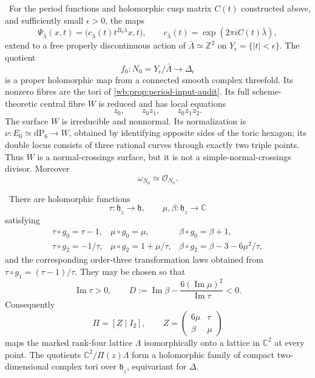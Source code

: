 \begin{theorem}
\label{wb:thm:candidate-cusp-geometry}
\ For the period functions and holomorphic cusp matrix \(C(t)\)
constructed above, and sufficiently small \(\epsilon>0\), the maps
\[
 \Psi_{\bar\lambda}(x,t)=
 \bigl(c_{\bar\lambda}(t)t^{B_0\bar\lambda}x,t\bigr),
 \qquad
 c_{\bar\lambda}(t)=\exp(2\pi iC(t)\bar\lambda),
\tag{2.5}
\]
extend to a free properly discontinuous action of
\(\bar\Lambda\simeq\mathbb Z^2\) on
\(Y_\epsilon=\{|t|<\epsilon\}\).  The quotient
\[
 f_0:N_0=Y_\epsilon/\bar\Lambda\longrightarrow\Delta_\epsilon
\]
is a proper holomorphic map from a connected smooth complex threefold.
Its nonzero fibres are the tori of \cref{wb:prop:period-input-audit}.  Its full
scheme-theoretic central fibre \(W\) is reduced and has local equations
\[
 z_0,\qquad z_0z_1,\qquad z_0z_1z_2.
\tag{2.6}
\]
The surface \(W\) is irreducible and nonnormal.  Its normalization is
\(\nu:E_0\simeq\mathrm{dP}_6\to W\), obtained by identifying opposite sides
of the toric hexagon; its double locus consists of three rational curves
through exactly two triple points.  Thus \(W\) is a normal-crossings surface,
but it is not a simple-normal-crossings divisor.  Moreover
\[
 \omega_{N_0}\simeq\mathcal O_{N_0}.
\tag{2.6a}
\]
\end{theorem}

\begin{proposition}
\label{wb:prop:period-input-audit}
\ There are holomorphic functions
\[
 \tau:\mathfrak h_z\to\mathfrak h,
 \qquad \mu,\beta:\mathfrak h_z\to\mathbb C
\]
satisfying
\[
\begin{array}{lll}
\tau\circ g_0=\tau-1,&\mu\circ g_0=\mu,&\beta\circ g_0=\beta+1,\\
\tau\circ g_2=-1/\tau,&\mu\circ g_2=1+\mu/\tau,
 &\beta\circ g_2=\beta-3-6\mu^2/\tau,
\end{array}
\tag{2.1}
\]
and the corresponding order-three transformation laws obtained from
\(\tau\circ g_1=(\tau-1)/\tau\).  They may be chosen so that
\[
 \operatorname{Im}\tau>0,
 \qquad
 D:=\operatorname{Im}\beta-
 \frac{6(\operatorname{Im}\mu)^2}{\operatorname{Im}\tau}<0.
\tag{2.2}
\]
Consequently
\[
 \Pi=[Z\mid I_2],\qquad
 Z=\begin{pmatrix}6\mu&\tau\\ \beta&\mu\end{pmatrix}
\tag{2.3}
\]
maps the marked rank-four lattice \(\Lambda\) isomorphically onto a lattice
in \(\mathbb C^2\) at every point.  The quotients
\(\mathbb C^2/\Pi(z)\Lambda\) form a holomorphic family of compact
two-dimensional complex tori over \(\mathfrak h_z\), equivariant for
\(\Delta\).
\end{proposition}

